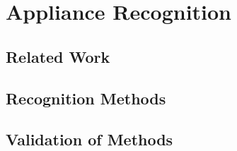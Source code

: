 \chapter{Appliance Recognition }
\section{Related Work} 
\section{Recognition Methods} 
\section{Validation of Methods} 